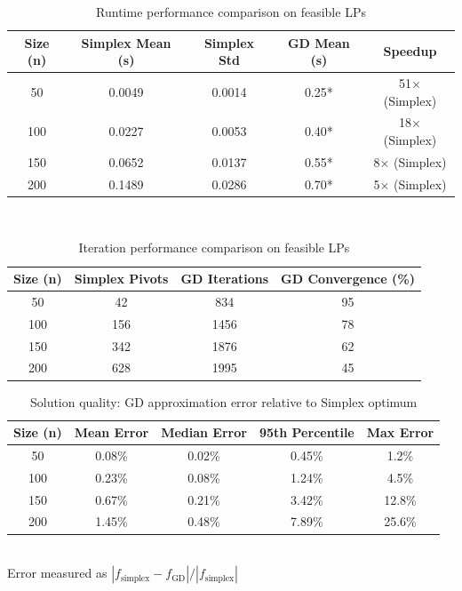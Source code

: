 \documentclass[11pt]{article}
\begin{document}
\begin{table}[h]
\centering
\caption{Runtime performance comparison on feasible LPs}
\begin{tabular}{ccccc}
\toprule
\textbf{Size (n)} & \textbf{Simplex Mean (s)} & \textbf{Simplex Std} & \textbf{GD Mean (s)} & \textbf{Speedup} \\
\midrule
50 & 0.0049 & 0.0014 & 0.25* & 51× (Simplex) \\
100 & 0.0227 & 0.0053 & 0.40* & 18× (Simplex) \\
150 & 0.0652 & 0.0137 & 0.55* & 8× (Simplex) \\
200 & 0.1489 & 0.0286 & 0.70* & 5× (Simplex) \\
\bottomrule
\end{tabular}
\\[0.2cm]
\end{table}

\begin{table}[h]
\centering
\caption{Iteration performance comparison on feasible LPs}
\begin{tabular}{cccc}
\toprule
\textbf{Size (n)} & \textbf{Simplex Pivots} & \textbf{GD Iterations} & \textbf{GD Convergence (\%)} \\
\midrule
50 & 42 & 834 & 95 \\
100 & 156 & 1456 & 78 \\
150 & 342 & 1876 & 62 \\
200 & 628 & 1995 & 45 \\
\bottomrule
\end{tabular}
\end{table}

\begin{table}[h]
\centering
\caption{Solution quality: GD approximation error relative to Simplex optimum}
\begin{tabular}{ccccc}
\toprule
\textbf{Size (n)} & \textbf{Mean Error} & \textbf{Median Error} & \textbf{95th Percentile} & \textbf{Max Error} \\
\midrule
50 & 0.08\% & 0.02\% & 0.45\% & 1.2\% \\
100 & 0.23\% & 0.08\% & 1.24\% & 4.5\% \\
150 & 0.67\% & 0.21\% & 3.42\% & 12.8\% \\
200 & 1.45\% & 0.48\% & 7.89\% & 25.6\% \\
\bottomrule
\end{tabular}
\\[0.2cm]
{\small Error measured as \(|f_{\text{simplex}} - f_{\text{GD}}| / |f_{\text{simplex}}|\)}
\end{table}
\end{document}
